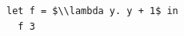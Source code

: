 \documentclass[border=10pt]{standalone}
\begin{document}
\begin{lstlisting}
let f = $\\lambda y. y + 1$ in
  f 3
\end{lstlisting}
\end{document}
